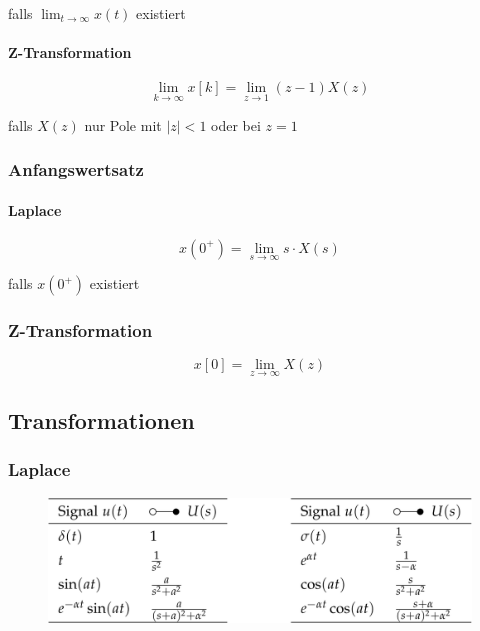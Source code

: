 \documentclass[
  10pt,
  a4paper,
  twocolumn]{article}
\let\oldparagraph\paragraph
\renewcommand{\paragraph}[1]{\oldparagraph{#1}\mbox{}}
\numberwithin{equation}{section}
\let\paragraph\oldparagraph
\renewcommand{\paragraph}[1]{\oldparagraph{#1}\mbox{}\par}
\begin{document}
falls \(\lim_{t\rightarrow\infty} x(t)\) existiert

\hypertarget{z-transformation}{%
\paragraph{Z-Transformation}\label{z-transformation}}

\[
\lim_{k\rightarrow\infty}x[k]=\lim_{z\rightarrow1}(z-1)X(z)
\]

falls \(X(z)\) nur Pole mit \(\lvert z\rvert < 1\) oder bei \(z=1\)

\hypertarget{anfangswertsatz}{%
\subsubsection{Anfangswertsatz}\label{anfangswertsatz}}

\hypertarget{laplace-1}{%
\paragraph{Laplace}\label{laplace-1}}

\[
x(0^+)=\lim_{s\rightarrow\infty}s\cdot X(s)
\]

falls \(x(0^+)\) existiert

\hypertarget{z-transformation-1}{%
\subsubsection{Z-Transformation}\label{z-transformation-1}}

\[
x[0]=\lim_{z\rightarrow\infty}X(z)
\]

\hypertarget{transformationen}{%
\subsection{Transformationen}\label{transformationen}}

\hypertarget{laplace-2}{%
\subsubsection{Laplace}\label{laplace-2}}

\begin{figure}[H]

{\centering \includegraphics{images/paste-17.png}

}

\end{figure}
\end{document}
